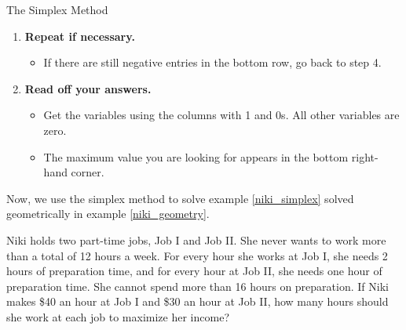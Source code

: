 \begin{summarybox}{The Simplex Method}
\begin{enumerate}
        \item \textbf{Repeat if necessary.}
              \begin{itemize}
                  \item If there are still negative entries in the bottom row, go back to step 4.
              \end{itemize}

        \item \textbf{Read off your answers.}
              \begin{itemize}
                  \item Get the variables using the columns with 1 and 0s. All other variables are zero.
                  \item The maximum value you are looking for appears in the bottom right-hand corner.
              \end{itemize}
    \end{enumerate}
\end{summarybox}

Now, we use the simplex method to solve example \ref{niki_simplex} solved geometrically in example \ref{niki_geometry}.

\begin{example}\label{niki_simplex}
    Niki holds two part-time jobs, Job I and Job II. She never wants to work more than a total of 12 hours a week. For every hour she works at Job I, she needs 2 hours of preparation time, and for every hour at Job II, she needs one hour of preparation time. She cannot spend more than 16 hours on preparation. If Niki makes \$40 an hour at Job I and \$30 an hour at Job II, how many hours should she work at each job to maximize her income?
\end{example}


